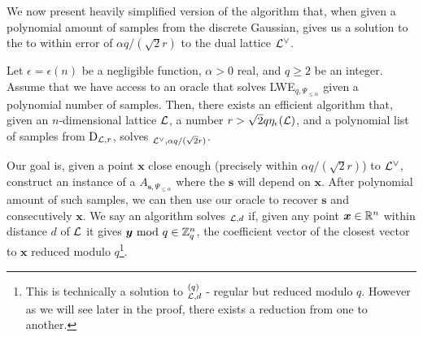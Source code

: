 We now present heavily simplified version of the algorithm that, when given a polynomial amount of samples from the discrete Gaussian, gives us a solution to the  to within error of $\alpha q /(\sqrt{2} r)$ to the dual lattice $\mathcal{L}^{\vee}$.
\begin{lemma}\label{classical}
        Let $\epsilon = \epsilon(n)$ be a negligible function, $\alpha > 0$ real, and $q \geq 2$ be an integer. Assume that we have access to an oracle that solves LWE$_{q, \Psi_{\leq \alpha}}$ given a polynomial number of samples. Then, there exists an efficient algorithm that, given an $n$-dimensional lattice $\mathcal{L}$, a number $r > \sqrt{2}q \eta_{\epsilon}(\mathcal{L})$, and a polynomial list of samples from $\text{D}_{\mathcal{L},r}$, solves $_{\mathcal{L}^{\vee},\alpha q/(\sqrt{2}r)}$.
\end{lemma}
Our goal is, given a point $\bm{x}$ close enough (precisely within $\alpha q/(\sqrt{2}r)$) to $\mathcal{L}^{\vee}$, construct an instance of a $A_{\bm{s}, \Psi_{\leq \alpha}}$ where the $\bm{s}$ will depend on $\bm{x}$. After polynomial amount of such samples, we can then use our oracle to recover $\bm{s}$ and consecutively $\bm{x}$. We say an algorithm solves $_{\mathcal{L}, d}$ if, given any point $\boldsymbol{x} \in \mathbb{R}^n$ within distance $d$ of $\mathcal{L}$ it gives $\boldsymbol{y} \text{ mod } q \in \mathbb{Z}_q^n$, the coefficient vector of the closest vector to $\bm{x}$ reduced modulo $q$\footnote{This is technically a solution to $^{(q)}_{\mathcal{L}, d}$ - regular  but reduced modulo $q$. However as we will see later in the proof, there exists a reduction from one to another.}.

